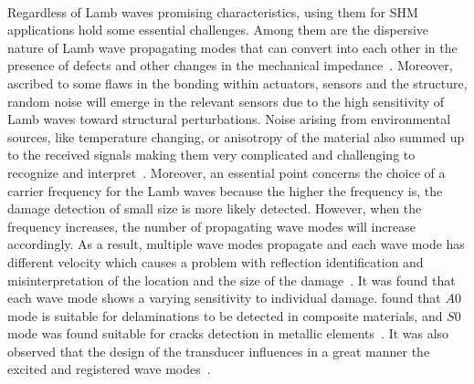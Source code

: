 \paragraph{}
Regardless of Lamb waves promising characteristics, using them for SHM applications hold some essential challenges. 
Among them are the dispersive nature of Lamb wave propagating modes that can convert into each other in the presence of defects and other changes in the mechanical 
impedance~\cite{Willberg2015}. 
Moreover, ascribed to some flaws in the bonding within actuators, sensors and the structure, random noise will emerge in the relevant sensors due to the high sensitivity of Lamb waves toward structural perturbations. 
Noise arising from environmental sources, like temperature changing, or anisotropy of the material also summed up to the received signals making them very complicated and challenging to recognize and interpret~\cite{Willberg2015}.
Moreover, an essential point concerns the choice of a carrier frequency for the Lamb waves because the higher the frequency is, the damage detection of small size is more likely detected.
However,  when the frequency increases, the number of propagating wave modes will increase accordingly.
As a result, multiple wave modes propagate and each wave mode has different velocity which causes a problem with reflection identification and misinterpretation of the location and the size of the damage~\cite{Ostachowicz2012}. 
It was found that each wave mode shows a varying sensitivity to individual damage. 
\textcite{Kessler2002b,Ihn2008} found that \(A0\) mode is suitable for delaminations to be detected in composite materials, and \(S0\) mode was found suitable for cracks detection in metallic elements~\cite{Ihn2004,Ihn2008}.
It was also observed that the design of the transducer influences in a great manner the excited and registered wave modes~\cite{Ostachowicz2010}.